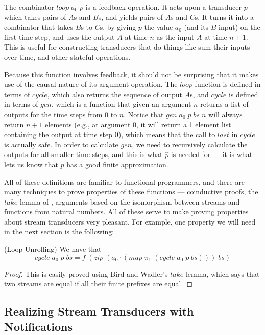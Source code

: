 The combinator $loop\;a_0\;p$ is a feedback operation. It acts
upon a transducer $p$ which takes pairs of $A$s and $B$s, and yields
pairs of $A$s and $C$s. It turns it into a combinator that takes $B$s
to $C$s, by giving $p$ the value $a_0$ (and its $B$-input) on the
first time step, and uses the output $A$ at time $n$ as the input $A$
at time $n+1$. This is useful for constructing transducers that do
things like sum their inputs over time, and other stateful operations. 

Because this function involves feedback, it should not be surprising
that it makes use of the causal nature of its argument operation. The
$loop$ function is defined in terms of $cycle$, which also returns the
sequence of output $A$s, and $cycle$ is defined in terms of $gen$,
which is a function that given an argument $n$ returns a list of
outputs for the time steps from $0$ to $n$. Notice that
$gen\;a_0\;p\;bs\;n$ will always return $n+1$ elements (e.g., at
argument 0, it will return a 1 element list containing the output at
time step 0), which means that the call to $last$ in $cycle$ is
actually safe. In order to calculate $gen$, we need to recursively
calculate the outputs for all smaller time steps, and this is what
$\hat{p}$ is needed for --- it is what lets us know that $p$ has a good
finite approximation.

All of these definitions are familiar to functional programmers, and
there are many techniques to prove properties of these functions ---
coinductive proofs, the $take$-lemma of \citet{bird-wadler}, arguments based on
the isomorphism between streams and functions from natural
numbers. All of these serve to make proving properties about stream
transducers very pleasant. For example, one property we will need in
the next section is the following:

\begin{lemma}{(Loop Unrolling)} We have that 
  \begin{displaymath}
    cycle\;a_0\;p\;bs = f\;(zip\;(a_0\cdot(map\;\pi_1\;(cycle\;a_0\;p\;bs)))\;bs)
  \end{displaymath}
\end{lemma}

\begin{proof}
  This is easily proved using Bird and Wadler's $take$-lemma, which
  says that two streams are equal if all their finite prefixes are
  equal.
\end{proof}


\subsection{Realizing Stream Transducers with Notifications}

